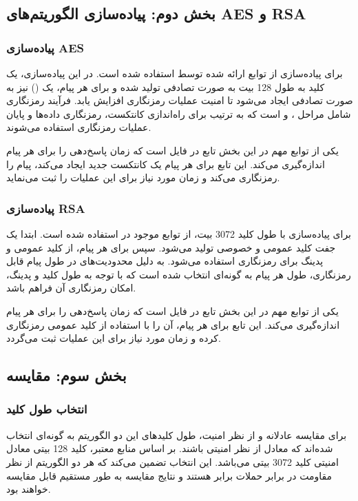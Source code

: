 \documentclass{report}
\begin{document}
\subsection*{بخش دوم: پیاده‌سازی الگوریتم‌های AES و RSA}

\subsubsection*{پیاده‌سازی AES}
برای پیاده‌سازی  از توابع ارائه شده توسط  استفاده شده است. در این پیاده‌سازی، یک کلید  به طول 128 بیت به صورت تصادفی تولید شده و برای هر پیام، یک  () نیز به صورت تصادفی ایجاد می‌شود تا امنیت عملیات رمزنگاری افزایش یابد. فرآیند رمزنگاری شامل مراحل ،  و  است که به ترتیب برای راه‌اندازی کانتکست، رمزنگاری داده‌ها و پایان عملیات رمزنگاری استفاده می‌شوند.

یکی از توابع مهم در این بخش تابع  در فایل  است که زمان پاسخ‌دهی  را برای هر پیام اندازه‌گیری می‌کند.
این تابع برای هر پیام یک کانتکست جدید  ایجاد می‌کند، پیام را رمزنگاری می‌کند و زمان مورد نیاز برای این عملیات را ثبت می‌نماید.

\subsubsection*{پیاده‌سازی RSA}
برای پیاده‌سازی  با طول کلید 3072 بیت، از توابع موجود در  استفاده شده است. ابتدا یک جفت کلید عمومی و خصوصی  تولید می‌شود. سپس برای هر پیام، از کلید عمومی  و پدینگ  برای رمزنگاری استفاده می‌شود. به دلیل محدودیت‌های  در طول پیام قابل رمزنگاری، طول هر پیام به گونه‌ای انتخاب شده است که با توجه به طول کلید و پدینگ، امکان رمزنگاری آن فراهم باشد.

یکی از توابع مهم در این بخش تابع  در فایل  است که زمان پاسخ‌دهی  را برای هر پیام اندازه‌گیری می‌کند.
این تابع برای هر پیام، آن را با استفاده از کلید عمومی  رمزنگاری کرده و زمان مورد نیاز برای این عملیات ثبت می‌گردد.

\subsection*{بخش سوم: مقایسه}

\subsubsection*{انتخاب طول کلید}
برای مقایسه عادلانه  و  از نظر امنیت، طول کلیدهای این دو الگوریتم به گونه‌ای انتخاب شده‌اند که معادل از نظر امنیتی باشند. بر اساس منابع معتبر، کلید 128 بیتی  معادل امنیتی کلید 3072 بیتی  می‌باشد. این انتخاب تضمین می‌کند که هر دو الگوریتم از نظر مقاومت در برابر حملات برابر هستند و نتایج مقایسه به طور مستقیم قابل مقایسه خواهند بود.
\end{document}

